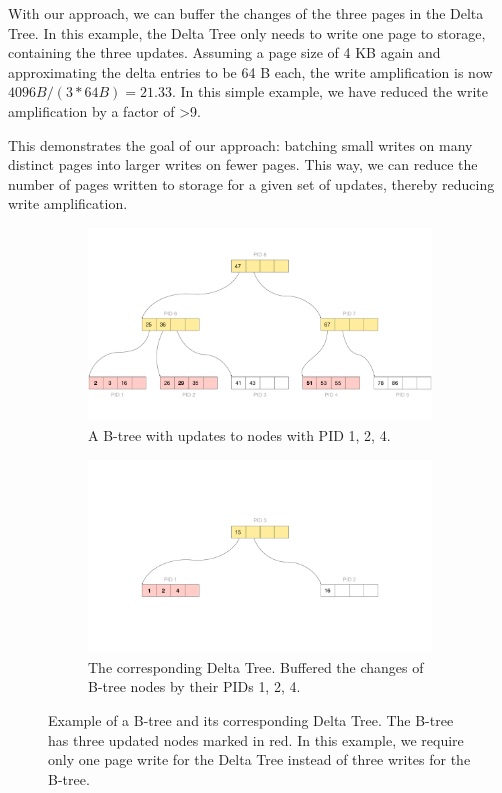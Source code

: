 With our approach, we can buffer the changes of the three pages in the Delta Tree.
In this example, the Delta Tree only needs to write one page to storage, containing the three updates.
Assuming a page size of 4 KB again and approximating the delta entries to be 64 B each, the write amplification is now $4096 B / (3 * 64 B) = 21.33$.
In this simple example, we have reduced the write amplification by a factor of >9.

This demonstrates the goal of our approach: batching small writes on many distinct pages into larger writes on fewer pages.
This way, we can reduce the number of pages written to storage for a given set of updates, thereby reducing write amplification.

\begin{figure}[htpb]
  \centering
  \begin{subfigure}[t]{0.95\textwidth}
    \centering
    \includegraphics[width=\textwidth]{figures/b_tree_with_pid.pdf}
    \caption{A B-tree with updates to nodes with \ac{PID} {1, 2, 4}.}
  \end{subfigure}
  \hfill
  \begin{subfigure}[t]{0.95\textwidth}
    \centering
    \includegraphics[width=\textwidth]{figures/delta_tree_update.pdf}
    \caption{The corresponding Delta Tree. Buffered the changes of B-tree nodes by their \ac{PID}s {1, 2, 4}.}
  \end{subfigure}
  \caption{Example of a B-tree and its corresponding Delta Tree. The B-tree has three updated nodes marked in red. In this example, we require only one page write for the Delta Tree instead of three writes for the B-tree.}
  \label{fig:delta-tree-example}
\end{figure}

